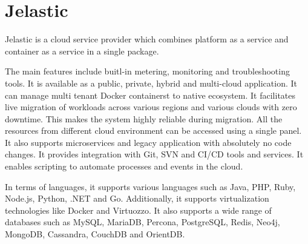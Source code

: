 \section{Jelastic}
Jelastic is a cloud service provider which combines
platform as a service and container as a service in a single
package. 

The main features include buitl-in metering, monitoring 
and troubleshooting tools. It is available as a public, private, 
hybrid and multi-cloud application. It can manage multi tenant 
Docker containerst to native ecosystem. It facilitates live migration
of workloads across various regions and various clouds with 
zero downtime. This makes the system highly reliable during 
migration. All the resources from different cloud environment
can be accessed using a single panel. It also supports 
microservices and legacy application with absolutely no code
changes. It provides integration with Git, SVN and CI/CD tools
and services. It enables scripting to automate processes and events
in the cloud.

In terms of languages, it supports various languages such as Java, PHP, Ruby,
Node.js, Python, .NET and Go. Additionally, it supports virtualization 
technologies like Docker and Virtuozzo. It also supports a wide
range of databases such as MySQL, MariaDB, Percona, PostgreSQL, 
Redis, Neo4j, MongoDB, Cassandra, CouchDB and OrientDB.


\cite{JelasticWiki}

